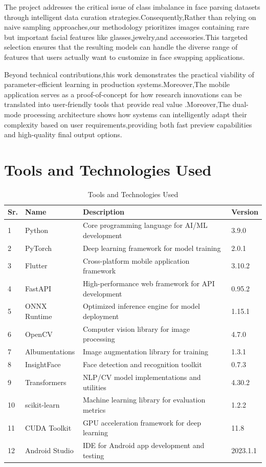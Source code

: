 \documentclass[12pt,a4paper]{report}
\begin{document}
The project addresses the critical issue of class imbalance in face parsing datasets through intelligent data curation strategies.Consequently,Rather than relying on naive sampling approaches,our methodology prioritizes images containing rare but important facial features like glasses,jewelry,and accessories.This targeted selection ensures that the resulting models can handle the diverse range of features that users actually want to customize in face swapping applications.

Beyond technical contributions,this work demonstrates the practical viability of parameter-efficient learning in production systems.Moreover,The mobile application serves as a proof-of-concept for how research innovations can be translated into user-friendly tools that provide real value .Moreover,The dual-mode processing architecture shows how systems can intelligently adapt their complexity based on user requirements,providing both fast preview capabilities and high-quality final output options.

\section{Tools and Technologies Used}

\begin{table}[H]
\centering
\caption{Tools and Technologies Used}
\label{tab:tools_technologies}
\begin{tabular}{|p{1cm}|p{2.5cm}|p{8.5cm}|p{1.5cm}|}
\hline
\textbf{Sr.} & \textbf{Name} & \textbf{Description} & \textbf{Version} \\
\hline
1 & Python & Core programming language for AI/ML development & 3.9.0 \\
\hline
2 & PyTorch & Deep learning framework for model training & 2.0.1 \\
\hline
3 & Flutter & Cross-platform mobile application framework & 3.10.2 \\
\hline
4 & FastAPI & High-performance web framework for API development & 0.95.2 \\
\hline
5 & ONNX Runtime & Optimized inference engine for model deployment & 1.15.1 \\
\hline
6 & OpenCV & Computer vision library for image processing & 4.7.0 \\
\hline
7 & Albumentations & Image augmentation library for training & 1.3.1 \\
\hline
8 & InsightFace & Face detection and recognition toolkit & 0.7.3 \\
\hline
9 & Transformers & NLP/CV model implementations and utilities & 4.30.2 \\
\hline
10 & scikit-learn & Machine learning library for evaluation metrics & 1.2.2 \\
\hline
11 & CUDA Toolkit & GPU acceleration framework for deep learning & 11.8 \\
\hline
12 & Android Studio & IDE for Android app development and testing & 2023.1.1 \\
\hline
\end{tabular}
\end{table}
\end{document}
